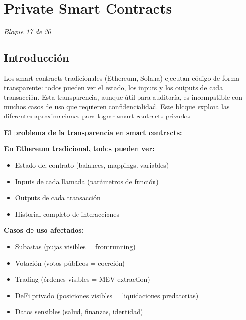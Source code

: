 \documentclass[11pt,a4paper,twoside]{book}
\theoremstyle{definition}
\theoremstyle{remark}
\begin{document}
\chapter{Private Smart Contracts}
\label{ch:bloque17}

\begin{center}
\textit{Bloque 17 de 20}
\end{center}

\section*{Introducción}

Los smart contracts tradicionales (Ethereum, Solana) ejecutan código de forma transparente: todos pueden ver el estado, los inputs y los outputs de cada transacción. Esta transparencia, aunque útil para auditoría, es incompatible con muchos casos de uso que requieren confidencialidad. Este bloque explora las diferentes aproximaciones para lograr smart contracts privados.

\begin{keyidea}
\textbf{El problema de la transparencia en smart contracts:}

\textbf{En Ethereum tradicional, todos pueden ver:}
\begin{itemize}
    \item Estado del contrato (balances, mappings, variables)
    \item Inputs de cada llamada (parámetros de función)
    \item Outputs de cada transacción
    \item Historial completo de interacciones
\end{itemize}

\textbf{Casos de uso afectados:}
\begin{itemize}
    \item Subastas (pujas visibles = frontrunning)
    \item Votación (votos públicos = coerción)
    \item Trading (órdenes visibles = MEV extraction)
    \item DeFi privado (posiciones visibles = liquidaciones predatorias)
    \item Datos sensibles (salud, finanzas, identidad)
\end{itemize}
\end{keyidea}
\end{document}
